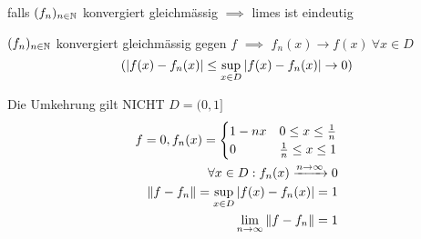 \begin{Bem}
  falls $(f_n)_{n\in\mathbb{N}}$ konvergiert gleichmässig $\implies$ limes ist eindeutig
\end{Bem}
\begin{Bem}
  $(f_n)_{n\in\mathbb{N}}$ konvergiert gleichmässig gegen $f$ $\implies$ $f_n(x)\to f(x)\ \forall x\in D$
  \[(\left| f(x)-f_n(x) \right|\leq \sup_{x\in D} \left| f(x)-f_n(x) \right|\to 0)\]
\end{Bem}
\begin{Bem}
  Die Umkehrung gilt NICHT $D=(0,1]$
  \begin{align*}
    f=0, f_n(x)=\begin{cases}1-nx&0\leq x\leq \frac{1}{n}\\0&\frac{1}{n}\leq x \leq 1\end{cases}\\
    \forall x\in D: f_n(x)\xrightarrow{n\to\infty}0\\
    \left\| f-f_n \right\|=\sup_{x\in D} \left| f(x)-f_n(x) \right| =1\\
    \displaystyle\lim_{n\rightarrow\infty}\left\| f-f_n \right\|=1
  \end{align*}
\end{Bem}
